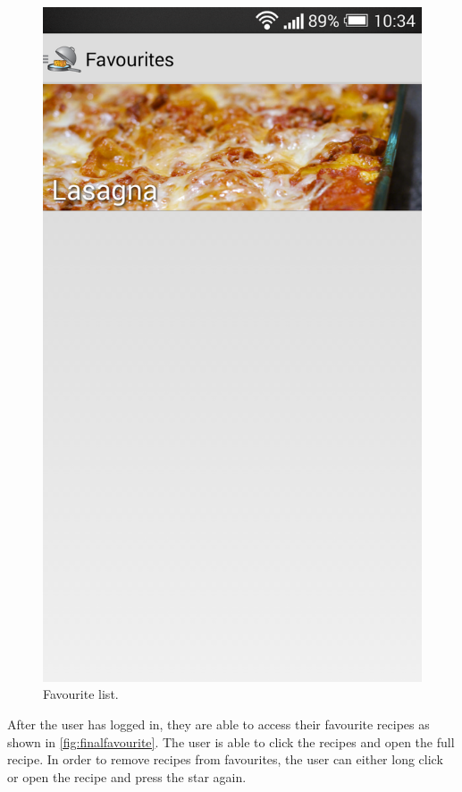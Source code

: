 \begin{figure}[H]
\centering
\begin{minipage}[t]{0.5\columnwidth}
\centering
\includegraphics[width=0.7\columnwidth]{img/screenshots/finalfavourite.png}
\caption{Favourite list\label{fig:finalfavourite}.}
\end{minipage}
\end{figure}

 After the user has logged in, they are able to access their favourite recipes as shown in \autoref{fig:finalfavourite}. The user is able to click the recipes and open the full recipe. In order to remove recipes from favourites, the user can either long click or open the recipe and press the star again.